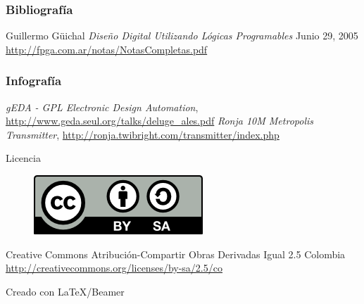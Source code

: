 \documentclass{beamer}
\begin{document}
\begin{frame}
  \frametitle<presentation>{Bibliografía}
  \begin{thebibliography}{99}
    \beamertemplatearticlebibitems
  Guillermo Güichal
    \newblock \emph{Diseño Digital Utilizando Lógicas Programables}
    \newblock Junio 29, 2005
    \newblock \url{http://fpga.com.ar/notas/NotasCompletas.pdf}
  \end{thebibliography}
\end{frame}

\begin{frame}
  \frametitle<presentation>{Infografía}
  \begin{thebibliography}{99}
    \beamertemplatearticlebibitems
  \emph{gEDA - GPL Electronic Design Automation}, \url{http://www.geda.seul.org/talks/deluge_ales.pdf}
  \emph{Ronja 10M Metropolis Transmitter}, \url{http://ronja.twibright.com/transmitter/index.php}
  \end{thebibliography}
\end{frame}

\begin{frame}
  \begin{block}{Licencia}
    \begin{figure}
      \includegraphics[scale=0.9]{img/by-sa}
    \end{figure}
    \centering
    \small Creative Commons Atribución-Compartir Obras Derivadas Igual 2.5 Colombia
    \small \url{http://creativecommons.org/licenses/by-sa/2.5/co}
\end{block}
\begin{block}{}
  Creado con \LaTeX/Beamer
\end{block}
\end{frame}
\end{document}
